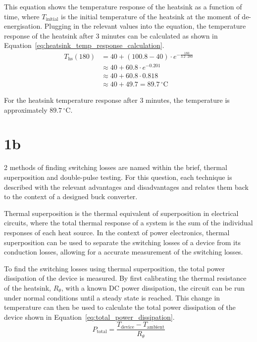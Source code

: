 \documentclass[a4paper, 12pt, titlepage]{report}
\begin{document}
This equation shows the temperature response of the heatsink as a function of time, where \(T_{\mathrm{initial}}\) is the initial temperature of the heatsink at the moment of de-energisation. Plugging in the relevant values into the equation, the temperature response of the heatsink after 3 minutes can be calculated as shown in Equation~\ref{eq:heatsink_temp_response_calculation}.
\begin{equation}
    \begin{split}
        T_{\mathrm{hs}}(180) &= 40 + (100.8 - 40) \cdot e^{-\frac{180}{3.2 \cdot 280}} \\
        &\approx 40 + 60.8 \cdot e^{-0.201} \\
        &\approx 40 + 60.8 \cdot 0.818 \\
        &\approx 40 + 49.7 = 89.7\,^\circ\mathrm{C}
    \label{eq:heatsink_temp_response_calculation}
    \end{split}
\end{equation}

For the heatsink temperature response after 3 minutes, the temperature is approximately \(89.7\,^\circ\mathrm{C}\).

\section{1b}
2 methods of finding switching losses are named within the brief, thermal superposition and double-pulse testing. For this question, each technique is described with the relevant advantages and disadvantages and relates them back to the context of a designed buck converter.

Thermal superposition is the thermal equivalent of superposition in electrical circuits, where the total thermal response of a system is the sum of the individual responses of each heat source. In the context of power electronics, thermal superposition can be used to separate the switching losses of a device from its conduction losses, allowing for a accurate measurement of the switching losses.

To find the switching losses using thermal superposition, the total power dissipation of the device is measured. By first calibrating the thermal resistance of the heatsink, \(R_\theta\), with a known DC power dissipation, the circuit can be run under normal conditions until a steady state is reached. This change in temperature can then be used to calculate the total power dissipation of the device shown in Equation~\ref{eq:total_power_dissipation}.
\begin{equation}
    P_{\mathrm{total}} = \frac{T_{\mathrm{device}} - T_{\mathrm{ambient}}}{R_\theta}
    \label{eq:total_power_dissipation}
\end{equation}
\end{document}
